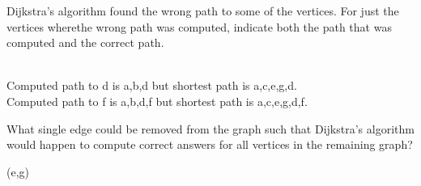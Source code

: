 \begin{prob}
\begin{subprobset}
        \begin{subprob}
        	Dijkstra’s algorithm found the wrong path to some of the vertices. 
        	For just the vertices wherethe wrong path was computed, indicate both the path that was computed and the correct path.
        	\begin{soln}
                \\
                Computed path to d is a,b,d but shortest path is a,c,e,g,d.
                \\
                Computed path to f is a,b,d,f but shortest path is a,c,e,g,d,f.
            \end{soln}
            \vspace{3em}
        \end{subprob}
        \begin{subprob}
        	What single edge could be removed from the graph such that Dijkstra’s algorithm would happen to compute correct answers for all vertices in the remaining graph?
        	\begin{soln}
                (e,g)
            \end{soln}
            \vspace{2em}
        \end{subprob}
    \end{subprobset}
\end{prob}
